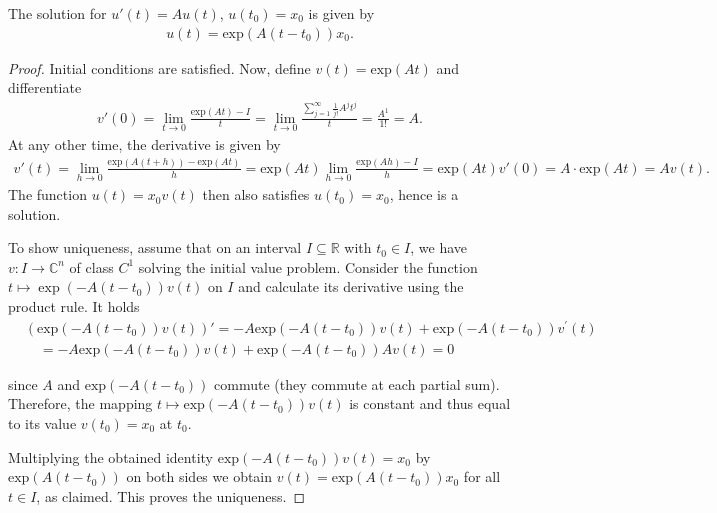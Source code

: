 \begin{prop}\label{prop:const-coeff-case}
	The solution for $u'(t) = A u(t)$, $u(t_{0}) = x_{0}$ is given by
	\begin{align*}
		u(t) = \text{exp}(A(t-t_{0}))x_{0}.
	\end{align*}
\end{prop}
\begin{proof}
	Initial conditions are satisfied. Now, define $v(t) = \text{exp}(At)$ and differentiate
	\begin{align*}
		v'(0) = \lim_{t \to 0} \frac{\text{exp}(At) - I}{t} = \lim_{t \to 0} \frac{\sum_{j = 1}^{\infty} \frac{1}{j!}A^{j}t^{j}}{t} = \frac{A^{1}}{1!} = A.
	\end{align*}
	At any other time, the derivative is given by
	\begin{align*}
		v'(t) = \lim_{h \to 0} \frac{\text{exp}(A(t+h)) - \text{exp}(At)}{h} = \text{exp}(At) \lim_{h \to 0} \frac{\text{exp}(Ah) - I}{h} = \text{exp}(At) v'(0) = A \cdot \text{exp}(At) = Av(t).
	\end{align*}
	The function $u(t) = x_{0} v(t)$ then also satisfies $u(t_{0}) = x_{0}$, hence is a solution.

	To show uniqueness, assume that on an interval $I \subseteq \mathbb{R}$ with $t_0 \in I$, we have $v: I \rightarrow \mathbb{C}^n$ of class $C^1$ solving the initial value problem. Consider the function $t \mapsto \exp (-A\left(t-t_0\right)) v(t)$ on $I$ and calculate its derivative using the product rule. It holds
	\begin{align*}
		 & \left(\text{exp}(-A\left(t-t_0\right)) v(t)\right)' =-A \text{exp}(-A\left(t-t_0\right)) v(t)+\text{exp}(-A\left(t-t_0\right)) v^{\prime}(t) \\
		 & \quad=-A \text{exp}(-A\left(t-t_0\right)) v(t)+\text{exp}(-A\left(t-t_0\right)) A v(t)=0
	\end{align*}

	since $A$ and $\text{exp}(-A\left(t-t_0\right))$ commute (they commute at each partial sum). Therefore, the mapping $t \mapsto \text{exp}(-A\left(t-t_0\right)) v(t)$ is constant and thus equal to its value $v(t_0)=x_0$ at $t_0$.

	Multiplying the obtained identity $\text{exp}(-A\left(t-t_0\right)) v(t)=x_0$ by $\text{exp}(A\left(t-t_0\right))$ on both sides we obtain $v(t)=\text{exp}(A\left(t-t_0\right)) x_0$ for all $t \in I$, as claimed. This proves the uniqueness.
\end{proof}


